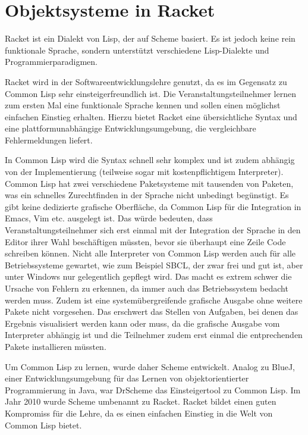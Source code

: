 \chapter{Objektsysteme in Racket}
Racket ist ein Dialekt von Lisp, der auf Scheme basiert. Es ist jedoch keine rein funktionale Sprache, sondern unterstützt verschiedene Lisp-Dialekte und  Programmierparadigmen. 

Racket wird in der Softwareentwicklungslehre genutzt, da es im Gegensatz zu Common Lisp sehr einsteigerfreundlich ist. Die Veranstaltungsteilnehmer lernen zum ersten Mal eine funktionale Sprache kennen und sollen einen möglichst einfachen Einstieg erhalten. Hierzu bietet Racket eine übersichtliche Syntax und eine plattformunabhängige Entwicklungsumgebung, die vergleichbare Fehlermeldungen liefert.

In Common Lisp wird die Syntax schnell sehr komplex und ist zudem abhängig von der Implementierung (teilweise sogar mit kostenpflichtigem Interpreter). Common Lisp hat zwei verschiedene Paketsysteme mit tausenden von Paketen, was ein schnelles Zurechtfinden in der Sprache nicht unbedingt begünstigt. Es gibt keine dedizierte grafische Oberfläche, da Common Lisp für die Integration in Emacs, Vim etc. ausgelegt ist. Das würde bedeuten, dass Veranstaltungsteilnehmer sich erst einmal mit der Integration der Sprache in den Editor ihrer Wahl beschäftigen müssten, bevor sie überhaupt eine Zeile Code schreiben können. Nicht alle Interpreter von Common Lisp werden auch für alle Betriebssysteme gewartet, wie zum Beispiel SBCL, der zwar frei und gut ist, aber unter Windows nur gelegentlich gepflegt wird. Das macht es extrem schwer die Ursache von Fehlern zu erkennen, da immer auch das Betriebssystem bedacht werden muss. Zudem ist eine systemübergreifende grafische Ausgabe ohne weitere Pakete nicht vorgesehen. Das erschwert das Stellen von Aufgaben, bei denen das Ergebnis visualisiert werden kann oder muss, da die grafische Ausgabe vom Interpreter abhängig ist und die Teilnehmer zudem erst einmal die entprechenden Pakete installieren müssten. 

Um Common Lisp zu lernen, wurde daher Scheme entwickelt. Analog zu BlueJ, einer Entwicklungsumgebung für das Lernen von objektorientierter Programmierung in Java, war DrScheme das Einsteigertool zu Common Lisp. Im Jahr 2010 wurde Scheme umbenannt zu Racket. Racket bildet einen guten Kompromiss für die Lehre, da es einen einfachen Einstieg in die Welt von Common Lisp bietet.


